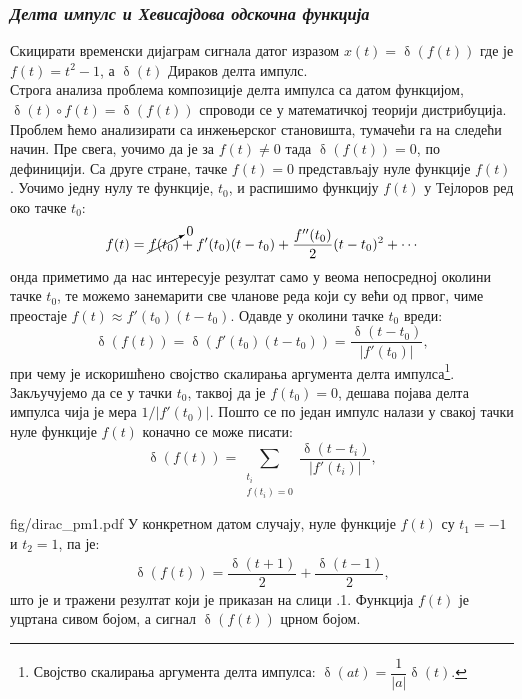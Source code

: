\subsubsection{\textit{Делта импулс и Хевисајдова одскочна функција}}
\noindent
\PID 
Скицирати временски дијаграм сигнала датог изразом $x(t) = \updelta(f(t))$ где је 
$f(t) = t^2 - 1$, а
$\updelta(t)$ Дираков делта импулс. \\[2mm]

\RESENJE  
Строга анализа проблема композиције делта импулса са датом функцијом, $\updelta(t) \circ f(t) = \updelta(f(t))$ 
спроводи се у математичкој теорији дистрибуција. Проблем ћемо анализирати са инжењерског становишта, 
тумачећи га на следећи начин. Пре свега, уочимо да је за $f(t) \neq 0$ тада $\updelta(f(t)) = 0$, по дефиницији.    
Са друге стране, тачке $f(t) = 0$ представљају нуле функције $f(t)$. Уочимо једну нулу те функције, $t_0$, и распишимо
функцију $f(t)$ у Тејлоров ред око тачке $t_0$:
\begin{eqnarray}
    f(t) = \cancelto{0}{f(t_0)} + f'(t_0) (t-t_0) + \dfrac{f''(t_0)}{2} (t-t_0)^2 + \cdots
\end{eqnarray}
онда приметимо да нас интересује резултат само у веома непосредној околини тачке $t_0$, те можемо занемарити све
чланове реда који су већи од првог, чиме преостаје $f(t) \approx f'(t_0) (t-t_0)$. Одавде у околини тачке 
$t_0$ вреди: 
\begin{equation}
    \updelta(f(t)) = \updelta(f'(t_0) (t-t_0)) = \dfrac{\updelta(t-t_0)}{|f'(t_0)|},
\end{equation}
при чему је искоришћено својство скалирања аргумента делта импулса\footnote{Својство скалирања аргумента делта импулса:
$\updelta(at) = \dfrac{1}{|a|} \updelta(t)$.}.
Закључујемо да се у тачки $t_0$, таквој да је $f(t_0) = 0$, дешава појава делта импулса чија је мера $1/|f'(t_0)|$.
Пошто се по један импулс налази у свакој тачки нуле функције $f(t)$ коначно се може писати:
\begin{equation}
    \updelta(f(t)) = \sum_{\substack{t_i \\[0.5mm] f(t_i)=0}} \dfrac{\updelta(t-t_i)}{|f'(t_i)|},
\end{equation}

\begin{slikaDesno}{fig/dirac_pm1.pdf}
У конкретном датом случају, нуле функције $f(t)$ су ${t_1 = -1}$ и {$t_2 = 1$}, па је:
\begin{eqnarray}
    \updelta(f(t)) = \dfrac{\updelta(t+1)}{2} + \dfrac{\updelta(t-1)}{2},
\end{eqnarray}
што је и тражени резултат који је приказан на слици \ID.1.
Функција $f(t)$ је уцртана сивом бојом, а сигнал $\updelta(f(t))$ црном бојом.

\end{slikaDesno}